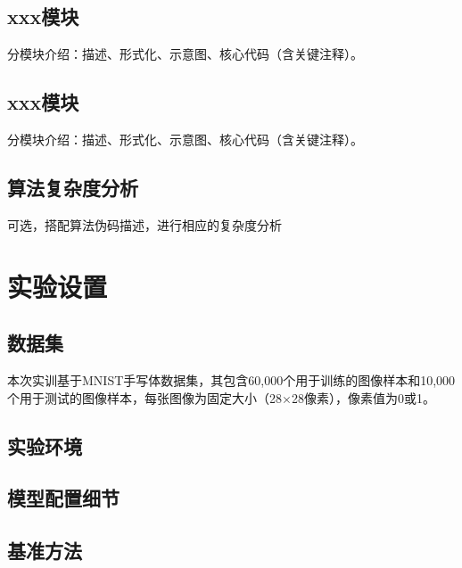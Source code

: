 \documentclass{style/course-report}
\begin{document}
\subsection{xxx模块}
分模块介绍：描述、形式化、示意图、核心代码（含关键注释）。

\subsection{xxx模块}
分模块介绍：描述、形式化、示意图、核心代码（含关键注释）。


\subsection{算法复杂度分析}
可选，搭配算法伪码描述，进行相应的复杂度分析


\section{实验设置}

\subsection{数据集}

本次实训基于MNIST手写体数据集\cite{lecun2002gradient}，其包含60,000个用于训练的图像样本和10,000个用于测试的图像样本，每张图像为固定大小（28$\times$28像素），像素值为0或1。


\subsection{实验环境}


\subsection{模型配置细节}

\subsection{基准方法}
\end{document}

